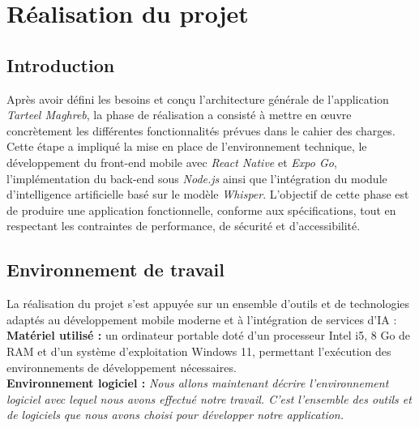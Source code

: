 \chapter{Réalisation du projet}

\section{Introduction}
Après avoir défini les besoins et conçu l’architecture générale de l’application \textit{Tarteel Maghreb}, la phase de réalisation a consisté à mettre en œuvre concrètement les différentes fonctionnalités prévues dans le cahier des charges. 
Cette étape a impliqué la mise en place de l’environnement technique, le développement du front-end mobile avec \textit{React Native} et \textit{Expo Go}, l’implémentation du back-end sous \textit{Node.js} ainsi que l’intégration du module d’intelligence artificielle basé sur le modèle \textit{Whisper}. 
L’objectif de cette phase est de produire une application fonctionnelle, conforme aux spécifications, tout en respectant les contraintes de performance, de sécurité et d’accessibilité.

\section{Environnement de travail}
La réalisation du projet s’est appuyée sur un ensemble d’outils et de technologies adaptés au développement mobile moderne et à l’intégration de services d’IA :\\

\textbf{Matériel utilisé :} un ordinateur portable doté d’un processeur Intel i5, 8 Go de RAM et d’un système d’exploitation Windows 11, permettant l’exécution des environnements de développement nécessaires.\\
  
\textbf{Environnement logiciel :} \textit{Nous allons maintenant décrire l’environnement logiciel avec lequel nous avons effectué notre travail. C’est l’ensemble des outils et de logiciels que nous avons choisi pour développer notre application.}\\
   
